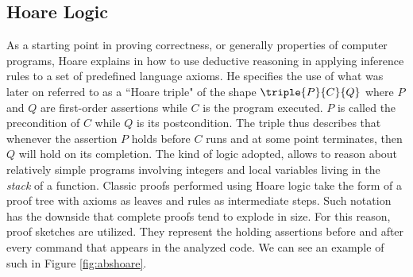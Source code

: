 \subsection{Hoare Logic}

As a starting point in proving correctness, or generally properties of computer programs, Hoare explains in \cite{hoare} how to use deductive reasoning in applying inference rules to a set of predefined language axioms. He specifies the use of what was later on referred to as a ``Hoare triple" of the shape $\triple{P}{C}{Q}$ where $P$ and $Q$ are first-order assertions while $C$ is the program executed. $P$ is called the precondition of $C$ while $Q$ is its postcondition. The triple thus describes that whenever the assertion $P$ holds before $C$ runs and at some point terminates, then $Q$ will hold on its completion. The kind of logic adopted, allows to reason about relatively simple programs involving integers and local variables living in the \textit{stack} of a function. Classic proofs performed using Hoare logic take the form of a proof tree with axioms as leaves and rules as intermediate steps. Such notation has the downside that complete proofs tend to explode in size. For this reason, proof sketches are utilized. They represent the holding assertions before and after every command that appears in the analyzed code. We can see an example of such in Figure \ref{fig:abshoare}.
